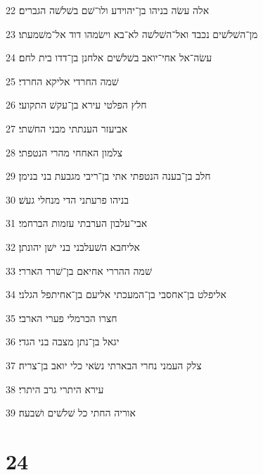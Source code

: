 \par 22 אלה עשׂה בניהו בן־יהוידע ולו־שׁם בשׁלשׁה הגברים׃
\par 23 מן־השׁלשׁים נכבד ואל־השׁלשׁה לא־בא וישׂמהו דוד אל־משׁמעתו׃
\par 24 עשׂה־אל אחי־יואב בשׁלשׁים אלחנן בן־דדו בית לחם׃
\par 25 שׁמה החרדי אליקא החרדי׃
\par 26 חלץ הפלטי עירא בן־עקשׁ התקועי׃
\par 27 אביעזר הענתתי מבני החשׁתי׃
\par 28 צלמון האחחי מהרי הנטפתי׃
\par 29 חלב בן־בענה הנטפתי אתי בן־ריבי מגבעת בני בנימן׃
\par 30 בניהו פרעתני הדי מנחלי געשׁ׃
\par 31 אבי־עלבון הערבתי עזמות הברחמי׃
\par 32 אליחבא השׁעלבני בני ישׁן יהונתן׃
\par 33 שׁמה ההררי אחיאם בן־שׁרר האררי׃
\par 34 אליפלט בן־אחסבי בן־המעכתי אליעם בן־אחיתפל הגלני׃
\par 35 חצרו הכרמלי פערי הארבי׃
\par 36 יגאל בן־נתן מצבה בני הגדי׃
\par 37 צלק העמני נחרי הבארתי נשׂאי כלי יואב בן־צריה׃
\par 38 עירא היתרי גרב היתרי׃
\par 39 אוריה החתי כל שׁלשׁים ושׁבעה׃

\chapter{24}

